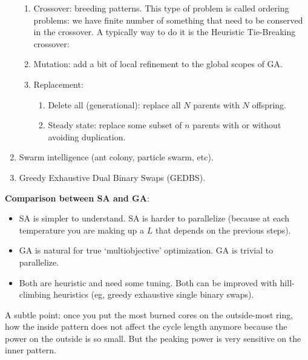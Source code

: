 \documentclass{school-22.211-notes}
\begin{document}
\begin{enumerate}
\begin{enumerate}
  \item Crossover: breeding patterns. This type of problem is called
    ordering problems: we have finite number of something that need to
    be conserved in the crossover. A typically way to do it is the
    Heuristic Tie-Breaking crossover:

  \item Mutation: add a bit of local refinement to the global scopes of GA. 

  \item Replacement: 
    \begin{enumerate}
    \item Delete all (generational): replace all $N$ parents with $N$
      offspring.  

    \item Steady state: replace some subset of $n$ parents with or
      without avoiding duplication.
    \end{enumerate}
  \end{enumerate}


\item Swarm intelligence (ant colony, particle swarm, etc). 
\item Greedy Exhaustive Dual Binary Swaps (GEDBS). 
\end{enumerate}

\textbf{Comparison between SA and GA}: 

\begin{itemize}
\item SA is simpler to understand. SA is harder to parallelize (because
  at each temperature you are making up a $L$ that depends on the
  previous steps).

\item GA is natural for true `multiobjective' optimization. GA is
  trivial to parallelize.

\item Both are heuristic and need some tuning. Both can be improved
  with hill-climbing heuristics (eg, greedy exhaustive single binary
  swaps).
\end{itemize}

A subtle point: once you put the most burned cores on the outside-most
ring, how the inside pattern does not affect the cycle length anymore
because the power on the outside is so small. But the peaking power is
very sensitive on the inner pattern.



\clearpage
\end{document}
